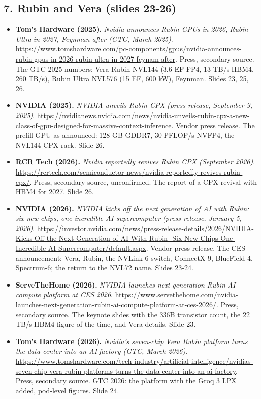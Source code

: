 \subsection*{7. Rubin and Vera (slides 23-26)}
\begin{itemize}[leftmargin=1.2em,itemsep=3pt]\sloppy
\item \textbf{Tom's Hardware (2025).} \textit{Nvidia announces Rubin GPUs in 2026, Rubin Ultra in 2027, Feynman after (GTC, March 2025)}. \url{https://www.tomshardware.com/pc-components/gpus/nvidia-announces-rubin-gpus-in-2026-rubin-ultra-in-2027-feynam-after}. Press, secondary source. The GTC 2025 numbers: Vera Rubin NVL144 (3.6 EF FP4, 13 TB/s HBM4, 260 TB/s), Rubin Ultra NVL576 (15 EF, 600 kW), Feynman. Slides 23, 25, 26.
\item \textbf{NVIDIA (2025).} \textit{NVIDIA unveils Rubin CPX (press release, September 9, 2025)}. \url{https://nvidianews.nvidia.com/news/nvidia-unveils-rubin-cpx-a-new-class-of-gpu-designed-for-massive-context-inference}. Vendor press release. The prefill GPU as announced: 128 GB GDDR7, 30 PFLOP/s NVFP4, the NVL144 CPX rack. Slide 26.
\item \textbf{RCR Tech (2026).} \textit{Nvidia reportedly revives Rubin CPX (September 2026)}. \url{https://rcrtech.com/semiconductor-news/nvidia-reportedly-revives-rubin-cpx/}. Press, secondary source, unconfirmed. The report of a CPX revival with HBM4 for 2027. Slide 26.
\item \textbf{NVIDIA (2026).} \textit{NVIDIA kicks off the next generation of AI with Rubin: six new chips, one incredible AI supercomputer (press release, January 5, 2026)}. \url{https://investor.nvidia.com/news/press-release-details/2026/NVIDIA-Kicks-Off-the-Next-Generation-of-AI-With-Rubin--Six-New-Chips-One-Incredible-AI-Supercomputer/default.aspx}. Vendor press release. The CES announcement: Vera, Rubin, the NVLink 6 switch, ConnectX-9, BlueField-4, Spectrum-6; the return to the NVL72 name. Slides 23-24.
\item \textbf{ServeTheHome (2026).} \textit{NVIDIA launches next-generation Rubin AI compute platform at CES 2026}. \url{https://www.servethehome.com/nvidia-launches-next-generation-rubin-ai-compute-platform-at-ces-2026/}. Press, secondary source. The keynote slides with the 336B transistor count, the 22 TB/s HBM4 figure of the time, and Vera details. Slide 23.
\item \textbf{Tom's Hardware (2026).} \textit{Nvidia's seven-chip Vera Rubin platform turns the data center into an AI factory (GTC, March 2026)}. \url{https://www.tomshardware.com/tech-industry/artificial-intelligence/nvidias-seven-chip-vera-rubin-platforms-turns-the-data-center-into-an-ai-factory}. Press, secondary source. GTC 2026: the platform with the Groq 3 LPX added, pod-level figures. Slide 24.

\end{itemize}
